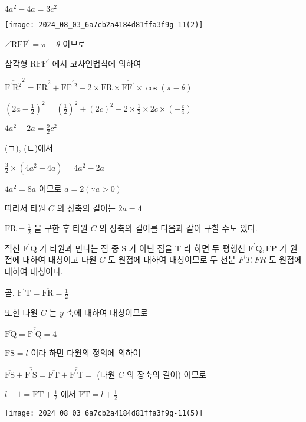 \documentclass[10pt]{article}
\begin{document}
\(4 a^{2}-4 a=3 c^{2}\)

\begin{center}
\texttt{[image: 2024\_08\_03\_6a7cb2a4184d81ffa3f9g-11(2)]}
\end{center}

\(\angle \mathrm{RFF}^{\prime}=\pi-\theta\) 이므로

삼각형 \(\mathrm{RFF}^{\prime}\) 에서 코사인법칙에 의하여

\({\overline{\mathrm{F}^{\prime} \mathrm{R}^{2}}}^{2}=\overline{\mathrm{FR}}^{2}+\overline{\mathrm{FF}}^{\prime}{ }^{2}-2 \times \overline{\mathrm{FR}} \times \overline{\mathrm{FF}^{\prime}} \times \cos (\pi-\theta)\)

\(\left(2 a-\frac{1}{2}\right)^{2}=\left(\frac{1}{2}\right)^{2}+(2 c)^{2}-2 \times \frac{1}{2} \times 2 c \times\left(-\frac{c}{4}\right)\)

\(4 a^{2}-2 a=\frac{9}{2} c^{2}\)

(ㄱ), (ㄴ)에서

\(\frac{3}{2} \times\left(4 a^{2}-4 a\right)=4 a^{2}-2 a\)

\(4 a^{2}=8 a\) 이므로 \(a=2(\because a>0)\)

따라서 타원 \(C\) 의 장축의 길이는 \(2 a=4\)

\(\overline{\mathrm{FR}}=\frac{1}{2}\) 을 구한 후 타원 \(C\) 의 장축의 길이를 다음과 같이 구할 수도 있다.

직선 \(\mathrm{F}^{\prime} \mathrm{Q}\) 가 타원과 만나는 점 중 S 가 아닌 점을 T 라 하면 두 평행선 \(\mathrm{F}^{\prime} \mathrm{Q}, \mathrm{FP}\) 가 원점에 대하여 대칭이고 타원 \(C\) 도 원점에 대하여 대칭이므로 두 선분 \(F^{\prime} T, F R\) 도 원점에 대하여 대칭이다.

곧, \(\overline{\mathrm{F}^{\prime} \mathrm{T}}=\overline{\mathrm{FR}}=\frac{1}{2}\)

또한 타원 \(C\) 는 \(y\) 축에 대하여 대칭이므로

\(\overline{\mathrm{FQ}}=\overline{\mathrm{F}^{\prime} \mathrm{Q}}=4\)

\(\overline{\mathrm{FS}}=l\) 이라 하면 타원의 정의에 의하여

\(\overline{\mathrm{FS}}+\overline{\mathrm{F}^{\prime} \mathrm{S}}=\overline{\mathrm{FT}}+\overline{\mathrm{F}^{\prime} \mathrm{T}}=\) (타원 \(C\) 의 장축의 길이) 이므로

\(l+1=\overline{\mathrm{FT}}+\frac{1}{2}\) 에서 \(\overline{\mathrm{FT}}=l+\frac{1}{2}\)

\begin{center}
\texttt{[image: 2024\_08\_03\_6a7cb2a4184d81ffa3f9g-11(5)]}
\end{center}
\end{document}
